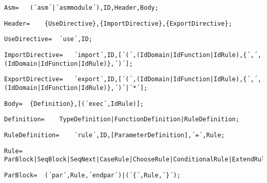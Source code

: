 \documentclass{article}
\begin{document}
    \begin{lstlisting}[mathescape=true]
     Asm= 	(´asm´|´asmmodule´),ID,Header,Body;
    \end{lstlisting}
    
    \begin{lstlisting}[mathescape=true]
     Header= 	{UseDirective},{ImportDirective},{ExportDirective};
    \end{lstlisting}
    
    \begin{lstlisting}[mathescape=true]
     UseDirective= 	´use´,ID;
    \end{lstlisting}
    
    \begin{lstlisting}[mathescape=true]
     ImportDirective= 	´import´,ID,[´(´,(IdDomain|IdFunction|IdRule),{´,´,(IdDomain|IdFunction|IdRule)},´)´];
    \end{lstlisting}
    
    \begin{lstlisting}[mathescape=true]
     ExportDirective= 	´export´,ID,[´(´,(IdDomain|IdFunction|IdRule),{´,´,(IdDomain|IdFunction|IdRule)},´)´|´*´];
    \end{lstlisting}
    
    \begin{lstlisting}[mathescape=true]
     Body= 	{Definition},[(´exec´,IdRule)];
    \end{lstlisting}
    
    \begin{lstlisting}[mathescape=true]
     Definition= 	TypeDefinition|FunctionDefinition|RuleDefinition;
    \end{lstlisting}
    
    \begin{lstlisting}[mathescape=true]
     RuleDefinition= 	´rule´,ID,[ParameterDefinition],´=´,Rule;
    \end{lstlisting}
    
    \begin{lstlisting}[mathescape=true]
     Rule= 	ParBlock|SeqBlock|SeqNext|CaseRule|ChooseRule|ConditionalRule|ExtendRule|ForAllRule|ImportRule|IterateRule|LetRule|TurboReturnRule|WhileRule|UpdateRule|SkipRule|CallRule|LocalRule|PrintRule;
    \end{lstlisting}
    
    \begin{lstlisting}[mathescape=true]
     ParBlock= 	(´par´,Rule,´endpar´)|(´{´,Rule,´}´);
    \end{lstlisting}
    
\end{document}
